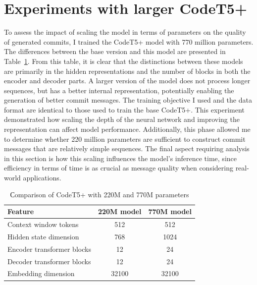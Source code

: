 \section[Larger model experiments]{Experiments with larger CodeT5+}\label{sec:larger_model_experiments}
To assess the impact of scaling the model in terms of parameters on the quality of generated commits, I trained the CodeT5+ model with 770 million parameters. The differences between the base version and this model are presented in Table~\ref{tab:220_vs_770_compare}. From this table, it is clear that the distinctions between these models are primarily in the hidden representations and the number of blocks in both the encoder and decoder parts. A larger version of the model does not process longer sequences, but has a better internal representation, potentially enabling the generation of better commit messages. The training objective I used and the data format are identical to those used to train the base CodeT5+. This experiment demonstrated how scaling the depth of the neural network and improving the representation can affect model performance. Additionally, this phase allowed me to determine whether 220 million parameters are sufficient to construct commit messages that are relatively simple sequences. The final aspect requiring analysis in this section is how this scaling influences the model's inference time, since efficiency in terms of time is as crucial as message quality when considering real-world applications.

\begin{table}[h]
    \centering
    \caption{Сomparison of CodeT5+ with 220M and 770M parameters}\label{tab:220_vs_770_compare}
    \renewcommand{\arraystretch}{1.5} %
    \begin{tabular}{|l|c|c|} %
    \hline %
    \textbf{Feature} & \textbf{220M model} & \textbf{770M model} \\ 
    \hline %
    Context window tokens       & 512 & 512 \\ \hline %
    Hidden state dimension       & 768 & 1024 \\ \hline %
    Encoder transformer blocks    & 12 & 24 \\ \hline %
    Decoder transformer blocks       & 12 & 24 \\ \hline %
    Embedding dimension       & 32100 & 32100 \\ \hline %
    \end{tabular}
\end{table}

